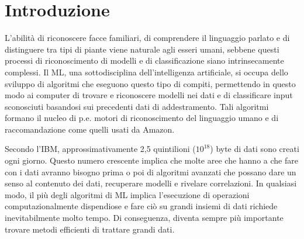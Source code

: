 \chapter{Introduzione}\label{ch:introduzione}





L'abilità di riconoscere facce familiari, di comprendere il linguaggio parlato e di 
distinguere tra tipi di piante viene naturale agli esseri umani, sebbene
questi processi di riconoscimento di modelli e di classificazione siano intrinsecamente 
complessi. Il \ac{ML}, una sottodisciplina dell'intelligenza artificiale, 
si occupa dello sviluppo di algoritmi che eseguono questo tipo di compiti, permettendo 
in questo modo %
ai computer di trovare e riconoscere modelli nei dati e di classificare input 
sconosciuti %
basandosi sui %
precedenti dati di addestramento. %
Tali algoritmi formano il nucleo di p.e. motori di riconoscimento del linguaggio %
umano e di raccomandazione come quelli usati da Amazon. %

Secondo l'IBM, approssimativamente %
2,5 quintilioni ($10^{18}$) byte di dati sono creati ogni giorno. 
Questo numero crescente implica che molte aree che hanno a che fare con i dati 
avranno bisogno prima o poi di algoritmi avanzati che possano dare un senso %
al contenuto dei dati, recuperare modelli e rivelare correlazioni. 
In qualsiasi modo, il più %
degli algoritmi di \ac{ML} implica l'esecuzione di operazioni computazionalmente dispendiose 
e fare ciò su grandi insiemi di dati richiede %
inevitabilmente molto %
tempo. %
Di conseguenza, %
diventa sempre più importante trovare metodi %
efficienti di trattare %
grandi dati. 

